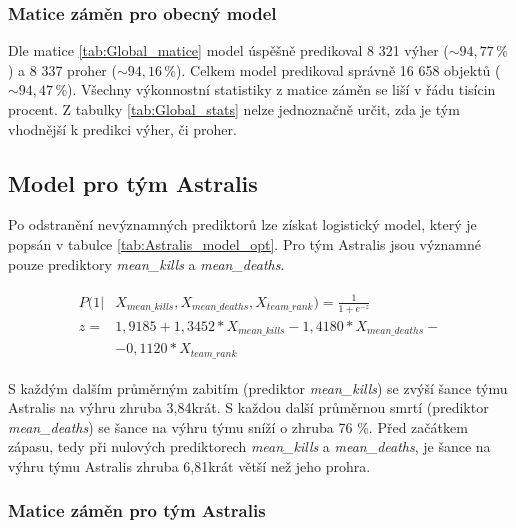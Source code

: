 \subsubsection{Matice záměn pro obecný model}





Dle matice \ref{tab:Global_matice} model úspěšně predikoval 8 321 výher ($\sim 94,77 \,\% $) a 8 337 proher ($\sim 94,16 \,\% $). Celkem
model predikoval správně 16 658 objektů ($\sim 94,47 \,\% $). Všechny výkonnostní statistiky z matice záměn se liší v řádu tisícin procent.
Z tabulky \ref{tab:Global_stats} nelze jednoznačně určit, zda je tým vhodnější k predikci výher, či proher.

\subsection{Model pro tým Astralis}



Po odstranění nevýznamných prediktorů lze získat logistický model, který je popsán v tabulce \ref{tab:Astralis_model_opt}. Pro tým Astralis jsou významné pouze prediktory
\textit{mean\_kills} a \textit{mean\_deaths}. 

\begin{align}
    \begin{split}
        P(1 | &X_{mean\_kills}, X_{mean\_deaths}, X_{team\_rank}) = \frac{1}{1 + e^{-z}} \\
        z =   &1,9185 + 1,3452*X_{mean\_kills} - 1,4180*X_{mean\_deaths} -\\
              &- 0,1120*X_{team\_rank}
    \end{split}
\end{align}

S každým dalším průměrným zabitím (prediktor \textit{mean\_kills}) se zvýší šance týmu Astralis na výhru zhruba 3,84krát. S každou další průměrnou smrtí
(prediktor \textit{mean\_deaths}) se šance na výhru týmu sníží o zhruba 76 \%. Před začátkem zápasu, tedy při nulových prediktorech \textit{mean\_kills} a
\textit{mean\_deaths}, je šance na výhru týmu Astralis zhruba 6,81krát větší než jeho prohra.

\subsubsection{Matice záměn pro tým Astralis}

